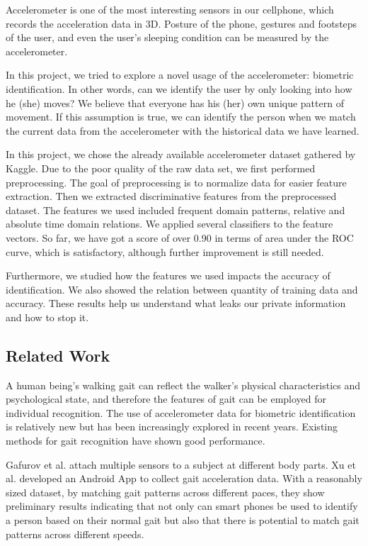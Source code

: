 \documentclass{article} %
\begin{document}
Accelerometer is one of the most interesting sensors in our cellphone, which records the acceleration data in 3D. Posture of the phone, gestures and footsteps of the user, and even the user's sleeping condition can be measured by the accelerometer.

In this project, we tried to explore a novel usage of the accelerometer: biometric identification. In other words, can we identify the user by only looking into how he (she) moves? We believe that everyone has his (her) own unique pattern of movement. If this assumption is true, we can identify the person when we match the current data from the accelerometer with the historical data we have learned. 

In this project, we chose the already available accelerometer dataset gathered by Kaggle. Due to the poor quality of the raw data set, we first performed preprocessing. The goal of preprocessing is to normalize data for easier feature extraction. Then we extracted discriminative features from the preprocessed dataset. The features we used included frequent domain patterns, relative and absolute time domain relations. We applied several classifiers to the feature vectors. So far, we have got a score of over 0.90 in terms of area under the ROC curve, which is satisfactory, although further improvement is still needed.

Furthermore, we studied how the features we used impacts the accuracy of identification. We also showed the relation between quantity of training data and accuracy. These results help us understand what leaks our private information and how to stop it.






\subsection{Related Work} 

A human being's walking gait can reflect the walker's physical characteristics and psychological state, and therefore the features of gait can be employed for individual recognition. The use of accelerometer data for biometric identification is relatively new but has been increasingly explored in recent years. Existing methods for gait recognition have shown good performance.
 
Gafurov et al.\cite{Gafurov:AIAT2007} attach multiple sensors to a subject at different body parts. Xu et al.\cite{Xu:ICB2012} developed an Android App to collect gait acceleration data. With a reasonably sized dataset, by matching gait patterns across different paces, they show preliminary results indicating that not only can smart phones be used to identify a person based on their normal gait but also that there is potential to match gait patterns across different speeds.
\end{document}
